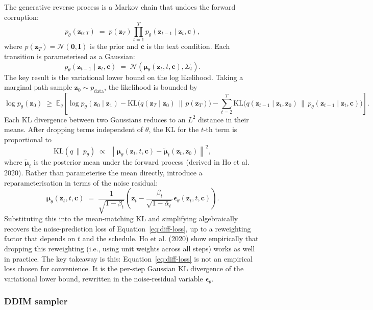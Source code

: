 \documentclass{article}
\begin{document}
The generative reverse process is a Markov chain that undoes the forward corruption:
$$p_\theta(\mathbf{z}_{0:T}) \;=\; p(\mathbf{z}_T)\prod_{t=1}^{T} p_\theta(\mathbf{z}_{t-1} \mid \mathbf{z}_t, \mathbf{c}),$$
where $p(\mathbf{z}_T) = \mathcal{N}(\mathbf{0}, \mathbf{I})$ is the prior and $\mathbf{c}$ is the text condition. Each transition is parameterised as a Gaussian:
$$p_\theta(\mathbf{z}_{t-1} \mid \mathbf{z}_t, \mathbf{c}) \;=\; \mathcal{N}\!\left(\boldsymbol{\mu}_\theta(\mathbf{z}_t, t, \mathbf{c}), \Sigma_t\right).$$
The key result is the variational lower bound on the log likelihood. Taking a marginal path sample $\mathbf{z}_0 \sim p_\text{data}$, the likelihood is bounded by
$$\log p_\theta(\mathbf{z}_0) \;\geq\; \mathbb{E}_q\!\left[\log p_\theta(\mathbf{z}_0 \mid \mathbf{z}_1) - \mathrm{KL}\!\bigl(q(\mathbf{z}_T \mid \mathbf{z}_0) \,\|\, p(\mathbf{z}_T)\bigr) - \sum_{t=2}^{T} \mathrm{KL}\!\bigl(q(\mathbf{z}_{t-1} \mid \mathbf{z}_t, \mathbf{z}_0) \,\|\, p_\theta(\mathbf{z}_{t-1} \mid \mathbf{z}_t, \mathbf{c})\bigr)\right].$$
Each KL divergence between two Gaussians reduces to an $L^2$ distance in their means. After dropping terms independent of $\theta$, the KL for the $t$-th term is proportional to
$$\mathrm{KL}(q \,\|\, p_\theta) \;\propto\; \left\| \boldsymbol{\mu}_\theta(\mathbf{z}_t, t, \mathbf{c}) - \tilde{\boldsymbol{\mu}}_t(\mathbf{z}_t, \mathbf{z}_0) \right\|^2,$$
where $\tilde{\boldsymbol{\mu}}_t$ is the posterior mean under the forward process (derived in Ho et al. 2020). Rather than parameterise the mean directly, introduce a reparameterisation in terms of the noise residual:
$$\boldsymbol{\mu}_\theta(\mathbf{z}_t, t, \mathbf{c}) \;=\; \frac{1}{\sqrt{1 - \beta_t}}\!\left(\mathbf{z}_t - \frac{\beta_t}{\sqrt{1 - \bar\alpha_t}} \boldsymbol{\epsilon}_\theta(\mathbf{z}_t, t, \mathbf{c})\right).$$
Substituting this into the mean-matching KL and simplifying algebraically recovers the noise-prediction loss of Equation~\ref{eq:diff-loss}, up to a reweighting factor that depends on $t$ and the schedule. Ho et al. (2020) show empirically that dropping this reweighting (i.e., using unit weights across all steps) works as well in practice. The key takeaway is this: Equation~\ref{eq:diff-loss} is not an empirical loss chosen for convenience. It is the per-step Gaussian KL divergence of the variational lower bound, rewritten in the noise-residual variable $\boldsymbol{\epsilon}_\theta$.

\subsubsection*{DDIM sampler}
\end{document}
